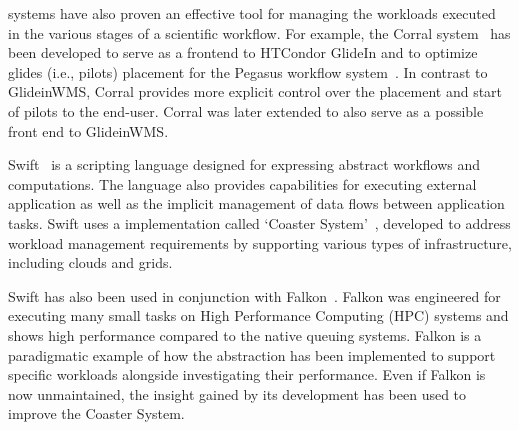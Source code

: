 \documentclass{sig-alternate}
\begin{document}



\pilotjob systems have also proven an effective tool for managing the workloads
executed in the various stages of a scientific workflow. For example, the Corral
system~\cite{rynge2011experiences} has been developed to serve as a frontend to
HTCondor GlideIn and to optimize glides (i.e., pilots) placement for the Pegasus
workflow system~\cite{deelman2015}. In contrast to GlideinWMS, Corral provides
more explicit control over the placement and start of pilots to the end-user.
Corral was later extended to also serve as a possible front end to GlideinWMS.

Swift~\cite{wilde2011swift} is a scripting language designed for expressing
abstract workflows and computations. The language also provides capabilities for
executing external application as well as the implicit management of data flows
between application tasks. Swift uses a \pilot implementation called
`Coaster System'~\cite{coasters_url}, developed to address workload management
requirements by supporting various types of infrastructure, including clouds and
grids.

Swift has also been used in conjunction with Falkon~\cite{raicu2007}. Falkon was
engineered for executing many small tasks on High Performance Computing (HPC)
systems and shows high performance compared to the native queuing systems.
Falkon is a paradigmatic example of how the \pilot abstraction has been
implemented to support specific workloads alongside investigating their
performance. Even if Falkon is now unmaintained, the insight gained by its
development has been used to improve the Coaster System.
\end{document}
